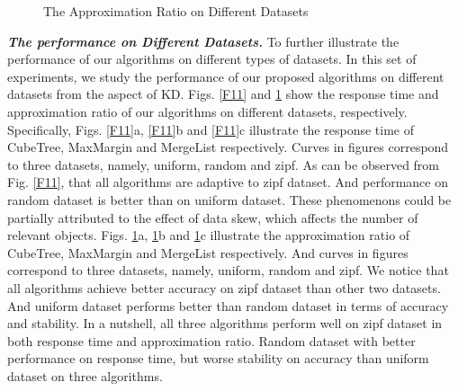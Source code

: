 \begin{figure}[!ht] \centering
\caption{The Approximation Ratio on Different Datasets}
\label{F12}
\end{figure}

\textbf{\textit{The performance on Different Datasets.}} To further illustrate the performance of our algorithms on different types of datasets. In this set of experiments, we study the performance of our proposed algorithms on different datasets from the aspect of KD. Figs. \ref{F11} and \ref{F12} show the response time and approximation ratio of our algorithms on different datasets, respectively. Specifically, Figs. \ref{F11}a, \ref{F11}b and \ref{F11}c illustrate the response time of CubeTree, MaxMargin and MergeList respectively. Curves in figures correspond to three datasets, namely, uniform, random and zipf. As can be observed from Fig. \ref{F11}, that all algorithms are adaptive to zipf dataset. And performance on random dataset is better than on uniform dataset. These phenomenons could be partially attributed to the effect of data skew, which affects the number of relevant objects. Figs. \ref{F12}a, \ref{F12}b and \ref{F12}c illustrate the approximation ratio of CubeTree, MaxMargin and MergeList respectively. And curves in figures correspond to three datasets, namely, uniform, random and zipf. We notice that all algorithms achieve better accuracy on zipf dataset than other two datasets. And uniform dataset performs better than random dataset in terms of accuracy and stability. In a nutshell, all three algorithms perform well on zipf dataset in both response time and approximation ratio. Random dataset with better performance on response time, but worse stability on accuracy than uniform dataset on three algorithms.

